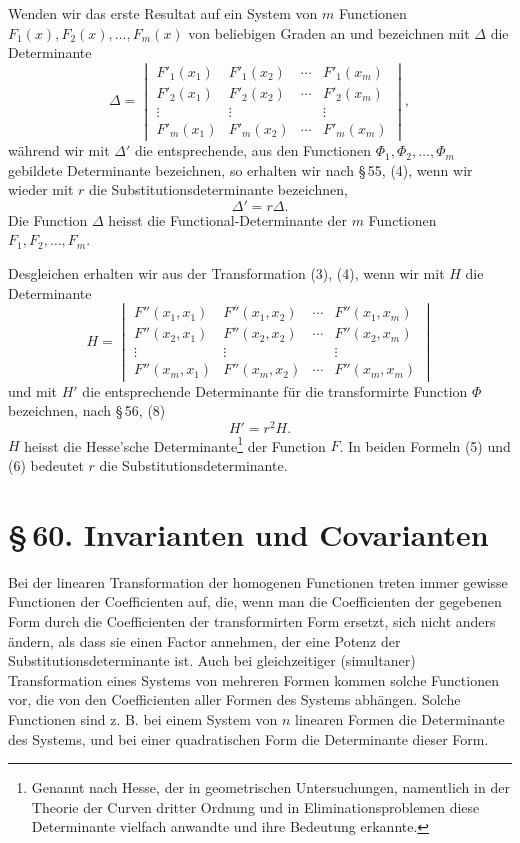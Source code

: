 \documentclass[11pt]{article}
\newcommand{\sect}[2]{\section*{\S\,#1. #2}}
\begin{document}
Wenden wir das erste Resultat auf ein System von $m$ Functionen $F_1(x),F_2(x),\ldots,F_m(x)$ von beliebigen Graden an und bezeichnen mit $\Delta$ die Determinante
\[
\Delta=\begin{vmatrix}
 F'_1(x_1)&F'_1(x_2)&\cdots&F'_1(x_m)\\
 F'_2(x_1)&F'_2(x_2)&\cdots&F'_2(x_m)\\
 \vdots&\vdots&&\vdots\\
 F'_m(x_1)&F'_m(x_2)&\cdots&F'_m(x_m)
\end{vmatrix},
\]
während wir mit $\Delta'$ die entsprechende, aus den Functionen $\Phi_1,\Phi_2,\ldots,\Phi_m$ gebildete Determinante bezeichnen, so erhalten wir nach \S\,55, (4), wenn wir wieder mit $r$ die Substitutionsdeterminante bezeichnen,
\begin{equation}
 \Delta'=r\Delta.
\tag{5}
\end{equation}
Die Function $\Delta$ heisst die Functional-Determinante der $m$ Functionen $F_1,F_2,\ldots,F_m$.

Desgleichen erhalten wir aus der Transformation (3), (4), wenn wir mit $H$ die Determinante
\[
H=\begin{vmatrix}
 F''(x_1,x_1)&F''(x_1,x_2)&\cdots&F''(x_1,x_m)\\
 F''(x_2,x_1)&F''(x_2,x_2)&\cdots&F''(x_2,x_m)\\
 \vdots&\vdots&&\vdots\\
 F''(x_m,x_1)&F''(x_m,x_2)&\cdots&F''(x_m,x_m)
\end{vmatrix}
\]
und mit $H'$ die entsprechende Determinante für die transformirte Function $\Phi$ bezeichnen, nach \S\,56, (8)
\begin{equation}
 H'=r^2H.
\tag{6}
\end{equation}
$H$ heisst die Hesse'sche Determinante\footnote{Genannt nach Hesse, der in geometrischen Untersuchungen, namentlich in der Theorie der Curven dritter Ordnung und in Eliminationsproblemen diese Determinante vielfach anwandte und ihre Bedeutung erkannte.} der Function $F$. In beiden Formeln (5) und (6) bedeutet $r$ die Substitutionsdeterminante.

\sect{60}{Invarianten und Covarianten}

Bei der linearen Transformation der homogenen Functionen treten immer gewisse Functionen der Coefficienten auf, die, wenn man die Coefficienten der gegebenen Form durch die Coefficienten der transformirten Form ersetzt, sich nicht anders ändern, als dass sie einen Factor annehmen, der eine Potenz der Substitutionsdeterminante ist. Auch bei gleichzeitiger (simultaner) Transformation eines Systems von mehreren Formen kommen solche Functionen vor, die von den Coefficienten aller Formen des Systems abhängen. Solche Functionen sind z. B. bei einem System von $n$ linearen Formen die Determinante des Systems, und bei einer quadratischen Form die Determinante dieser Form.
\end{document}
